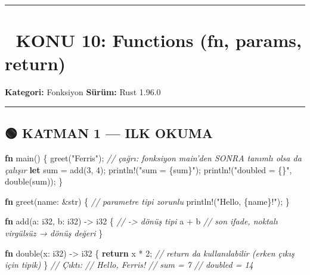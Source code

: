 \documentclass[12pt,a4paper]{article}
\newenvironment{Shaded}{}{}
\newcommand{\CommentTok}[1]{\textcolor[rgb]{0.38,0.63,0.69}{\textit{#1}}}
\newcommand{\ControlFlowTok}[1]{\textcolor[rgb]{0.00,0.44,0.13}{\textbf{#1}}}
\newcommand{\DataTypeTok}[1]{\textcolor[rgb]{0.56,0.13,0.00}{#1}}
\newcommand{\DecValTok}[1]{\textcolor[rgb]{0.25,0.63,0.44}{#1}}
\newcommand{\FunctionTok}[1]{\textcolor[rgb]{0.02,0.16,0.49}{#1}}
\newcommand{\KeywordTok}[1]{\textcolor[rgb]{0.00,0.44,0.13}{\textbf{#1}}}
\newcommand{\NormalTok}[1]{#1}
\newcommand{\OperatorTok}[1]{\textcolor[rgb]{0.40,0.40,0.40}{#1}}
\newcommand{\StringTok}[1]{\textcolor[rgb]{0.25,0.44,0.63}{#1}}
\begin{document}
\begin{center}\rule{0.5\linewidth}{0.5pt}\end{center}

\section{📘 KONU 10: Functions (fn, params, return)}\label{konu-10-functions-fn-params-return}

\textbf{Kategori:} Fonksiyon \textbar{} \textbf{Sürüm:} Rust 1.96.0

\begin{center}\rule{0.5\linewidth}{0.5pt}\end{center}

\subsection{🟢 KATMAN 1 --- ILK OKUMA}\label{katman-1-—-ilk-okuma-9}

\begin{Shaded}
\begin{Highlighting}[]
\KeywordTok{fn} \FunctionTok{main}\OperatorTok{()} \OperatorTok{\{}
    \FunctionTok{greet}\OperatorTok{(}\StringTok{"Ferris"}\OperatorTok{);}                    \CommentTok{// çağrı: fonksiyon main'den SONRA tanımlı olsa da çalışır}
    \KeywordTok{let}\NormalTok{ sum }\OperatorTok{=} \FunctionTok{add}\OperatorTok{(}\DecValTok{3}\OperatorTok{,} \DecValTok{4}\OperatorTok{);}
\NormalTok{    println}\OperatorTok{!(}\StringTok{"sum = \{sum\}"}\OperatorTok{);}
\NormalTok{    println}\OperatorTok{!(}\StringTok{"doubled = \{\}"}\OperatorTok{,} \FunctionTok{double}\OperatorTok{(}\NormalTok{sum}\OperatorTok{));}
\OperatorTok{\}}

\KeywordTok{fn} \FunctionTok{greet}\OperatorTok{(}\NormalTok{name}\OperatorTok{:} \OperatorTok{\&}\DataTypeTok{str}\OperatorTok{)} \OperatorTok{\{}                  \CommentTok{// parametre tipi zorunlu}
\NormalTok{    println}\OperatorTok{!(}\StringTok{"Hello, \{name\}!"}\OperatorTok{);}
\OperatorTok{\}}

\KeywordTok{fn} \FunctionTok{add}\OperatorTok{(}\NormalTok{a}\OperatorTok{:} \DataTypeTok{i32}\OperatorTok{,}\NormalTok{ b}\OperatorTok{:} \DataTypeTok{i32}\OperatorTok{)} \OperatorTok{-\textgreater{}} \DataTypeTok{i32} \OperatorTok{\{}         \CommentTok{// -\textgreater{} dönüş tipi}
\NormalTok{    a }\OperatorTok{+}\NormalTok{ b                               }\CommentTok{// son ifade, noktalı virgülsüz → dönüş değeri}
\OperatorTok{\}}

\KeywordTok{fn} \FunctionTok{double}\OperatorTok{(}\NormalTok{x}\OperatorTok{:} \DataTypeTok{i32}\OperatorTok{)} \OperatorTok{-\textgreater{}} \DataTypeTok{i32} \OperatorTok{\{}
    \ControlFlowTok{return}\NormalTok{ x }\OperatorTok{*} \DecValTok{2}\OperatorTok{;}                       \CommentTok{// return da kullanılabilir (erken çıkış için tipik)}
\OperatorTok{\}}
\CommentTok{// Çıktı:}
\CommentTok{// Hello, Ferris!}
\CommentTok{// sum = 7}
\CommentTok{// doubled = 14}
\end{Highlighting}
\end{Shaded}
\end{document}
